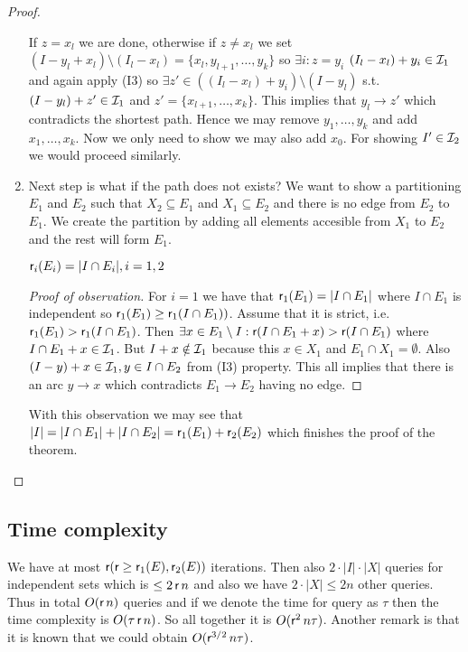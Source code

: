 \begin{proof}
\begin{enumerate}
		If $z = x_l$ we are done, otherwise if $z \neq x_l$ we set $(I - y_l + x_l) \setminus (I_l - x_l) = \{x_l, y_{l+1}, \dots, y_k\}$ so $\exists i : z = y_i$ $(I_l - x_l) + y_i \in \mathcal{I}_1$ and again apply (I3) so $\exists z' \in ((I_l - x_l) + y_i) \setminus (I - y_l)$ s.t. $(I - y_l) + z' \in \mathcal{I}_1$ and $z' = \{x_{l+1}, \dots, x_k\}$. This implies that $y_l \to z'$ which contradicts the shortest path. Hence we may remove $y_1, \dots, y_k$ and add $x_1, \dots, x_k$. Now we only need to show we may also add $x_0$. For showing $I' \in \mathcal{I}_2$ we would proceed similarly.
		
		\item Next step is what if the path does not exists? We want to show a partitioning $E_1$ and $E_2$ such that $X_2 \subseteq E_1$ and $X_1 \subseteq E_2$ and there is no edge from $E_2$ to $E_1$. We create the partition by adding all elements accesible from $X_1$ to $E_2$ and the rest will form $E_1$.

			\begin{observ}
				$\operatorname{\textsf{r}}_i (E_i) = |I \cap E_i|, i =1,2$
			\end{observ}

			\begin{proof}[Proof of observation]
				For $i = 1$ we have that $\operatorname{\textsf{r}}_1 (E_1) = |I \cap E_1|$ where $I \cap E_1$ is independent so $\operatorname{\textsf{r}}_1(E_1) \geq \operatorname{\textsf{r}}_1 (I \cap E_1))$. Assume that it is strict, i.e. $\operatorname{\textsf{r}}_1 (E_1) > \operatorname{\textsf{r}}_1 (I \cap E_1)$. Then $\exists x \in E_1 \setminus I : \operatorname{\textsf{r}}(I \cap E_1 + x) > \operatorname{\textsf{r}}(I \cap E_1)$ where $I \cap E_1 + x \in \mathcal{I}_1$. But $I + x \notin \mathcal{I}_1$ because this $x \in X_1$ and $E_1 \cap X_1 = \emptyset$. Also $(I - y) + x \in \mathcal{I}_1, y \in I \cap E_2$ from (I3) property. This all implies that there is an arc $y \to x$ which contradicts $E_1 \to E_2$ having no edge.
			\end{proof}

			With this observation we may see that $|I| = |I \cap E_1| + |I \cap E_2| = \operatorname{\textsf{r}}_1 (E_1) + \operatorname{\textsf{r}}_2(E_2)$ which finishes the proof of the theorem.
	\end{enumerate}
\end{proof}

\subsection{Time complexity}

We have at most $\operatorname{\textsf{r}} (\operatorname{\textsf{r}} \geq \operatorname{\textsf{r}}_1 (E), \operatorname{\textsf{r}}_2(E))$ iterations. Then also $2 \cdot |I| \cdot |X|$ queries for independent sets which is $\leq 2 \operatorname{\textsf{r}} n$ and also we have $2 \cdot |X| \leq 2n$ other queries. Thus in total $O(\operatorname{\textsf{r}} n)$ queries and if we denote the time for query as $\tau$ then the time complexity is $O(\tau \operatorname{\textsf{r}} n)$. So all together it is $O(\operatorname{\textsf{r}}^2 n \tau)$. Another remark is that it is known that we could obtain $O(\operatorname{\textsf{r}}^{3/2} n \tau)$.

